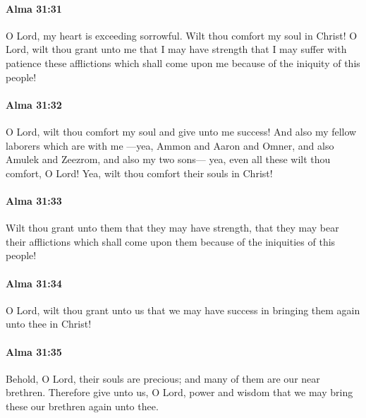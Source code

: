 		\paragraph{Alma 31:31} %
			\label{ALMA-31-31}

			O Lord, my heart is exceeding sorrowful.
			Wilt thou comfort my soul in Christ!
			O Lord, wilt thou grant unto me that I may have strength
			that I may suffer with patience these afflictions which shall come upon me
			because of the iniquity of this people!

		\paragraph{Alma 31:32} %
			\label{ALMA-31-32}

			O Lord, wilt thou comfort my soul and give unto me success!
			And also my fellow laborers which are with me
			---yea, Ammon and Aaron and Omner,
			and also Amulek and Zeezrom, and also my two sons---
			yea, even all these wilt thou comfort, O Lord!
			Yea, wilt thou comfort their souls in Christ!

		\paragraph{Alma 31:33} %
			\label{ALMA-31-33}

			Wilt thou grant unto them that they may have strength,
			that they may bear their afflictions which shall come upon them
			because of the iniquities of this people!

		\paragraph{Alma 31:34} %
			\label{ALMA-31-34}

			O Lord, wilt thou grant unto us
			that we may have success in bringing them again unto thee in Christ!

		\paragraph{Alma 31:35} %
			\label{ALMA-31-35}

			Behold, O Lord, their souls are precious;
			and many of them are our near brethren.
			Therefore give unto us, O Lord, power and wisdom
			that we may bring these our brethren again unto thee.

